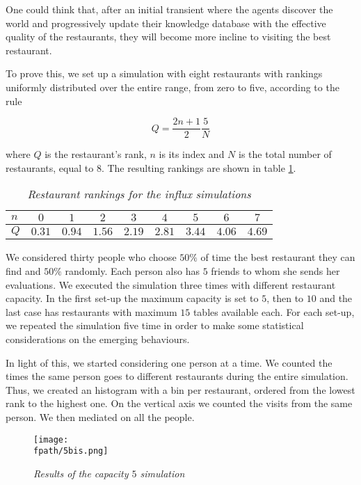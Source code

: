 \documentclass[10pt,a4paper,usenatbib]{article}
\newcommand{\fpath}{./Figs/}
\begin{document}
One could think that, after an initial transient where the agents discover the world and progressively update their knowledge database with the effective quality of the restaurants, they will become more incline to visiting the best restaurant. 

To prove this, we set up a simulation with eight restaurants with rankings uniformly distributed over the entire range, from zero to
five, according to the rule 

\begin{equation*}
Q = \frac{2 n + 1}{2} \frac{5}{N}
\end{equation*}

where $Q$ is the restaurant's rank, $n$ is its index and $N$ is the total number of restaurants, equal to $8$. The resulting rankings are shown in table \ref{tab:ranks}.

\begin{table}[!htb]
\centering
\begin{tabular}{l | cccccccc}
\hline
$n$ & $0$ & $1$ & $2$ & $3$ & $4$ & $5$ & $6$ & $7$ \\ \hline
$Q$ & $0.31$ & $0.94$ & $1.56$ & $2.19$ & $2.81$ & $3.44$ & $4.06$ & $4.69$\\ \hline
\end{tabular}
\caption{\small \textit{Restaurant rankings for the influx simulations}}
\label{tab:ranks}
\end{table}

We considered thirty people who choose $50\%$ of time the best restaurant they can find and $50\%$ randomly. Each person also has $5$ friends to whom she sends her evaluations. We executed the simulation three times with different restaurant capacity.
In the first set-up the maximum capacity is set to $5$, then to $10$ and the last case has restaurants with maximum $15$ tables available each. 
For each set-up, we repeated the simulation five time in order to make some statistical considerations on the emerging behaviours. 

In light of this, we started considering one person at a time. We counted the times the same person goes to different restaurants during the entire simulation. Thus, we created an histogram with a bin per restaurant, ordered from the lowest rank to the highest one. On the vertical axis we counted the visits from the same person. We then mediated on all the people. 

\begin{figure}[!htb]
\centering
\texttt{[image: \\fpath/5bis.png]}
\caption{\small \textit{Results of the capacity $5$ simulation}}
\label{fig:Cap5R_isto}
\end{figure}
\end{document}
